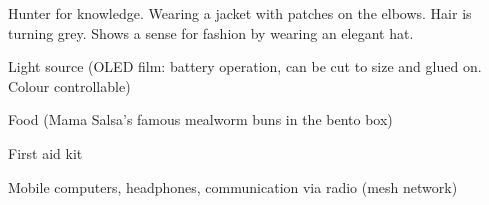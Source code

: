 \begin{npcBox}[title=Books]
    \begin{consequences}
    \item {}
    \item {}
    \item {}
    \end{consequences}

    \begin{npcDescription}
    Hunter for knowledge. Wearing a jacket with patches on the elbows. Hair is turning grey. Shows a sense for fashion by wearing an elegant hat.
    \end{npcDescription}


    \begin{equipment}
    \item Light source (OLED film: battery operation, can be cut to size and glued on. Colour controllable)
    \item Food (Mama Salsa's famous mealworm buns in the bento box)
    \item First aid kit
    \item Mobile computers, headphones, communication via radio (mesh network)
    \end{equipment}

\end{npcBox}

